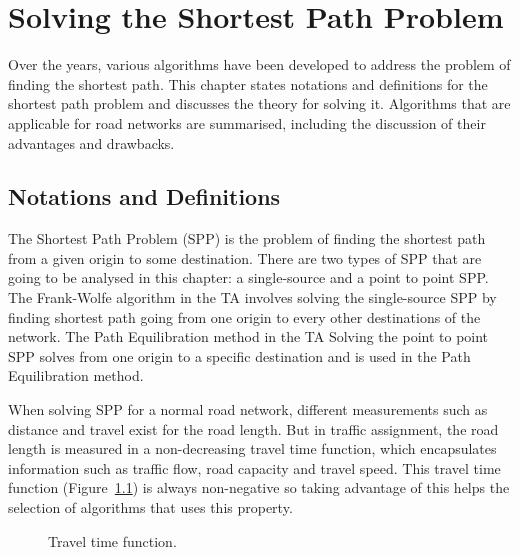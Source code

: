 \chapter{Solving the Shortest Path Problem}
\label{chap:solvingspp}

Over the years,
various algorithms have been developed 
to address the problem of finding the shortest path.
This chapter states notations and definitions for the shortest path problem and discusses
the theory for solving it.
Algorithms that are applicable for road networks are summarised,
including the discussion of their advantages and drawbacks.

\section{Notations and Definitions}
The Shortest Path Problem (SPP) is the problem of finding the shortest path from a given origin  to some destination.
There are two types of SPP that are going to
be analysed in this chapter:
a single-source and a point to point SPP.  
The Frank-Wolfe algorithm in the TA involves
solving the single-source SPP by finding shortest path going from one origin to every other destinations of the network.
The Path Equilibration method in the TA
Solving the point to point SPP solves from one origin to a specific destination and is used in the Path Equilibration method. 

When solving SPP for a normal road network,
different measurements such as distance and travel exist for the road length.
But in traffic assignment,
the road length is measured in a non-decreasing travel time function,
which encapsulates information such as traffic flow, road capacity and travel speed.
This travel time function (Figure~\ref{fig:flowfunction}) is always non-negative so taking advantage of this helps the selection of algorithms that uses this property.

\begin{figure}
    \centering
    \caption{Travel time function.}
    \label{fig:flowfunction}
\end{figure}

